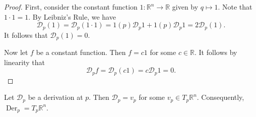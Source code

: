 \documentclass[notoc,notitlepage]{tufte-book}
\DeclareMathOperator{\Der}{Der}
\begin{document}
\begin{proof}
  First, consider the constant function $1 : \mathbb{R}^n \to \mathbb{R}$ given by $q \mapsto 1$.
  Note that $1 \cdot 1 = 1$. By Leibniz's Rule, we have
  \begin{equation*}
    \mathcal{D}_p(1) = \mathcal{D}_p(1 \cdot 1) = 1(p) \mathcal{D}_p 1 + 1(p) \mathcal{D}_p 1
      = 2 \mathcal{D}_p (1).
  \end{equation*}
  It follows that $\mathcal{D}_p (1) = 0$.

  Now let $f$ be a constant function. Then $f = c1$ for some $c \in \mathbb{R}$. It follows by
  linearity that
  \begin{equation*}
    \mathcal{D}_p f = \mathcal{D}_p (c1) = c \mathcal{D}_p 1 = 0.
  \end{equation*}
\end{proof}

\begin{thm}\label{thm:derivations_are_tangent_vectors}
  Let $\mathcal{D}_p$ be a derivation at $p$. Then $\mathcal{D}_p = v_p$ for some
  $v_p \in T_p \mathbb{R}^n$. Consequently, $\Der_p = T_p \mathbb{R}^n$.
\end{thm}
\end{document}
